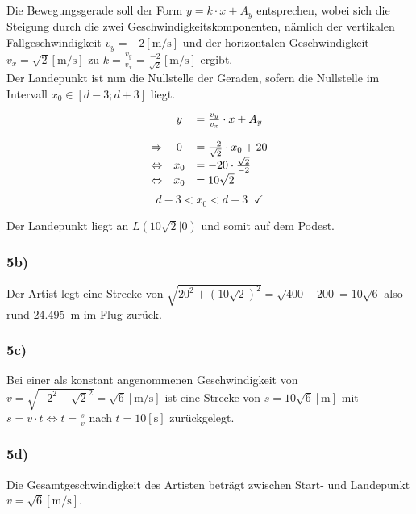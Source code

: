 Die Bewegungsgerade soll der Form $y=k\cdot x + A_y$ entsprechen, wobei sich die Steigung durch die zwei Geschwindigkeitskomponenten, nämlich der vertikalen Fallgeschwindigkeit $v_y = -2 [\si{\meter\per\second}]$ und der horizontalen Geschwindigkeit $v_x = \sqrt{2} [\si{\meter\per\second}]$ zu $k = \frac{v_y}{v_x} = \frac{-2}{\sqrt{2}} [\si{\meter\per\second}]$ ergibt.\\

Der Landepunkt ist nun die Nullstelle der Geraden, sofern die Nullstelle im Intervall $x_0 \in [d-3; d+3]$ liegt.

\begin{equation*}
	\begin{array}{ r c l }
		& y &= \frac{v_y}{v_x} \cdot x + A_y\\
		\\
		\Rightarrow 	& 0   &= \frac{-2}{\sqrt{2}} \cdot x_0 + 20\\
		\Leftrightarrow & x_0 &= -20 \cdot \frac{\sqrt{2}}{-2}\\
		\Leftrightarrow & x_0 &= 10\sqrt{2}
	\end{array}
\end{equation*}
\begin{equation*}
	d-3 < x_0 < d+3 \;\;\checkmark
\end{equation*}

Der Landepunkt liegt an $L(10\sqrt{2}|0)$ und somit auf dem Podest.

\subsubsection*{5b)}
Der Artist legt eine Strecke von $\sqrt{20^2+(10\sqrt{2})^2}=\sqrt{400+200}=10\sqrt{6}$ also rund \SI{24.495}{\meter} im Flug zurück.

\subsubsection*{5c)}
Bei einer als konstant angenommenen Geschwindigkeit von $v = \sqrt{-2^2+\sqrt{2}^2} = \sqrt{6} [\si{\meter\per\second}]$ ist eine Strecke von $s=10\sqrt{6} [\si{\meter}]$ mit $s=v\cdot t\Leftrightarrow t=\frac{s}{v}$ nach $t=10 [\si{\second}]$ zurückgelegt.

\subsubsection*{5d)}
Die Gesamtgeschwindigkeit des Artisten beträgt zwischen Start- und Landepunkt $v = \sqrt{6} [\si{\meter\per\second}]$.
